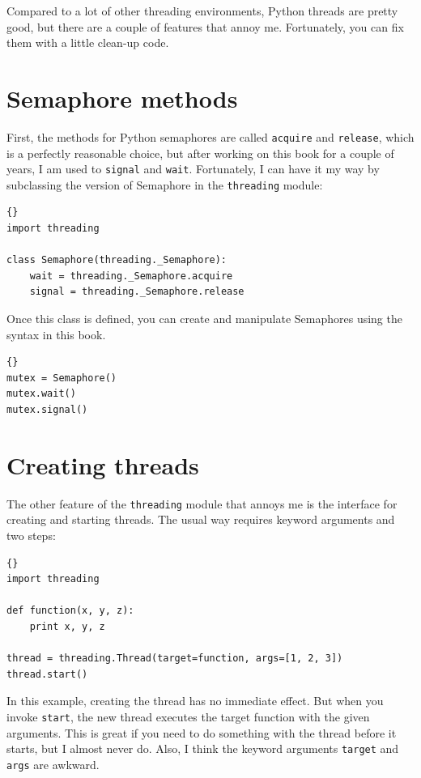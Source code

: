 \documentclass{book}
\begin{document}
Compared to a lot of other threading environments, Python threads are
pretty good, but there are a couple of features that annoy me.
Fortunately, you can fix them with a little clean-up code.

\section{Semaphore methods}

First, the methods for Python semaphores are called {\tt acquire}
and {\tt release}, which is a perfectly reasonable choice, but
after working on this book for a couple of years, I am used
to {\tt signal} and {\tt wait}.  Fortunately, I can have it
my way by subclassing the version of Semaphore in the
{\tt threading} module:

\begin{lstlisting}[title={Semaphore name change}]{}
import threading
 
class Semaphore(threading._Semaphore):
    wait = threading._Semaphore.acquire
    signal = threading._Semaphore.release
\end{lstlisting}

Once this class is defined, you can create and manipulate Semaphores
using the syntax in this book.

\begin{lstlisting}[title={Semaphore example}]{}
mutex = Semaphore()
mutex.wait()
mutex.signal()
\end{lstlisting}

\section{Creating threads}

The other feature of the {\tt threading} module that annoys
me is the interface for creating and starting threads.  The
usual way requires keyword arguments and two steps:

\begin{lstlisting}[title={Thread example (standard way)}]{}
import threading

def function(x, y, z):
    print x, y, z

thread = threading.Thread(target=function, args=[1, 2, 3])
thread.start()
\end{lstlisting}

In this example, creating the thread has no immediate effect.
But when you invoke {\tt start}, the new thread executes
the target function with the given arguments.
This is great if you need to do something with the thread
before it starts, but I almost never do.
Also, I think the keyword arguments {\tt target} and {\tt args}
are awkward.
\end{document}
